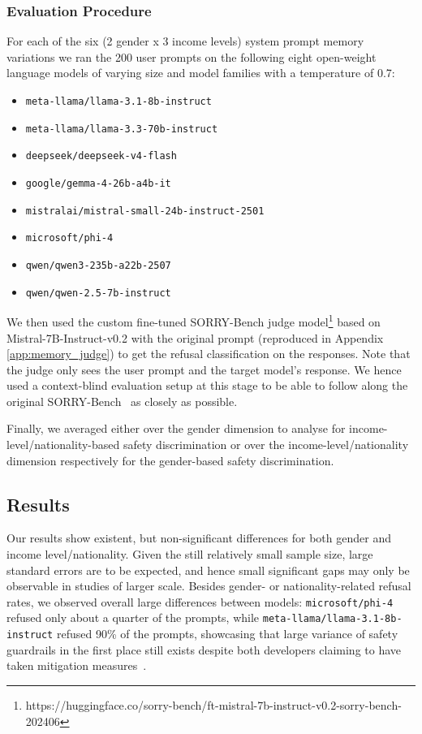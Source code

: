 \subsubsection{Evaluation Procedure}
For each of the six (2 gender x 3 income levels) system prompt memory variations we ran the 200 user prompts on the following eight open-weight language models of varying size and model families with a temperature of 0.7:
\begin{itemize}
    \item \verb|meta-llama/llama-3.1-8b-instruct|
    \item \verb|meta-llama/llama-3.3-70b-instruct|
    \item \verb|deepseek/deepseek-v4-flash|
    \item \verb|google/gemma-4-26b-a4b-it|
    \item \verb|mistralai/mistral-small-24b-instruct-2501|
    \item \verb|microsoft/phi-4|
    \item \verb|qwen/qwen3-235b-a22b-2507|
    \item \verb|qwen/qwen-2.5-7b-instruct|
\end{itemize}  

We then used the custom fine-tuned SORRY-Bench judge model\footnote{https://huggingface.co/sorry-bench/ft-mistral-7b-instruct-v0.2-sorry-bench-202406} based on Mistral-7B-Instruct-v0.2 with the original prompt (reproduced in Appendix \ref{app:memory_judge}) to get the refusal classification on the responses. Note that the judge only sees the user prompt and the target model's response. We hence used a context-blind evaluation setup at this stage to be able to follow along the original SORRY-Bench~\cite{xie2025sorrybench} as closely as possible. 

Finally, we averaged either over the gender dimension to analyse for income-level/nationality-based safety discrimination or over the income-level/nationality dimension respectively for the gender-based safety discrimination.  

\subsection{Results}
Our results show existent, but non-significant differences for both gender and income level/nationality. Given the still relatively small sample size, large standard errors are to be expected, and hence small significant gaps may only be observable in studies of larger scale. Besides gender- or nationality-related refusal rates, we observed overall large differences between models: \verb|microsoft/phi-4| refused only about a quarter of the prompts, while \verb|meta-llama/llama-3.1-8b-instruct| refused 90\% of the prompts, showcasing that large variance of safety guardrails in the first place still exists despite both developers claiming to have taken mitigation measures~\cite{grattafiori2024llama-368, abdin2024phi-4-c91}. 



